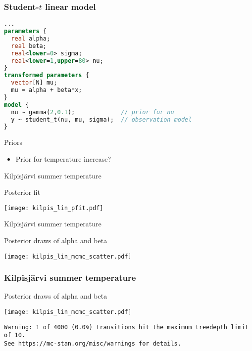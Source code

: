 \documentclass[finnish,english,t]{beamer}
\begin{document}
\begin{frame}[fragile]
  \frametitle{Student-$t$ linear model}
  {\small
  \begin{lstlisting}[language=Stan]
...
parameters {
  real alpha; 
  real beta; 
  real<lower=0> sigma;
  real<lower=1,upper=80> nu;
}
transformed parameters {
  vector[N] mu;
  mu = alpha + beta*x;
}
model {
  nu ~ gamma(2,0.1);             // prior for nu
  y ~ student_t(nu, mu, sigma);  // observation model
}
  \end{lstlisting}
}
\end{frame} 

\begin{frame}{Priors}

  \begin{itemize}
  \item Prior for temperature increase?
  \end{itemize}

\end{frame}

\begin{frame}{Kilpisjärvi summer temperature}

  Posterior fit
  
  \begin{center}
    \texttt{[image: kilpis\_lin\_pfit.pdf]}
  \end{center}

\end{frame}

\begin{frame}{Kilpisjärvi summer temperature}

  Posterior draws of alpha and beta
  
  \begin{center}
    \texttt{[image: kilpis\_lin\_mcmc\_scatter.pdf]}
  \end{center}
 
\end{frame}

\begin{frame}[fragile]
  \frametitle{Kilpisjärvi summer temperature}
  
  Posterior draws of alpha and beta
  
  \begin{center}
    \texttt{[image: kilpis\_lin\_mcmc\_scatter.pdf]}
  \end{center}

{\scriptsize
\begin{lstlisting}
Warning: 1 of 4000 (0.0%) transitions hit the maximum treedepth limit of 10.
See https://mc-stan.org/misc/warnings for details.
\end{lstlisting}
}
  
\end{frame}
\end{document}
